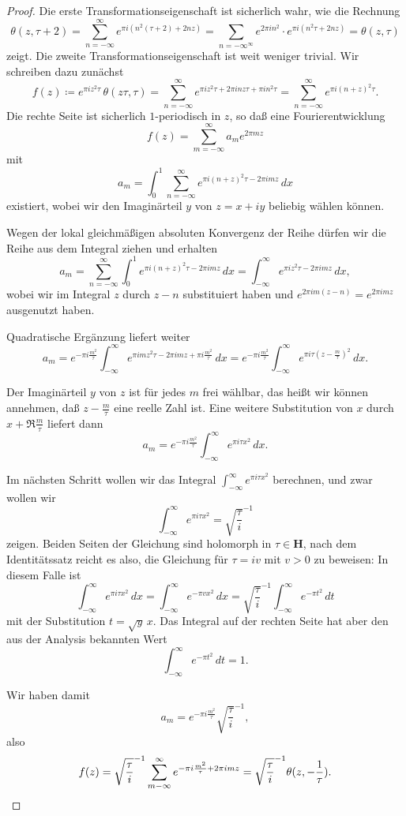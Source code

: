\documentclass[a4paper,twoside,openright]{report}
\theoremstyle{definition}
\theoremstyle{remark}
\begin{document}
\begin{proof}
  Die erste Transformationseigenschaft ist sicherlich wahr, wie die Rechnung
  \[
    \theta(z, \tau + 2) = \sum_{n = -\infty}^\infty e^{\pi i (n^2 (\tau + 2) + 2 n z)}
    = \sum_{n = -\infty^\infty} e^{2 \pi i n^2} \cdot e^{\pi i (n^2 \tau + 2 n z)}
    = \theta(z, \tau)
  \] 
  zeigt. Die zweite Transformationseigenschaft ist weit weniger trivial. Wir
  schreiben dazu zunächst
  \[
    f(z) \coloneqq e^{\pi i z^2 \tau} \, \theta(z \tau, \tau)
    = \sum_{n = -\infty}^\infty e^{\pi i z^2 \tau + 2 \pi i n z \tau + \pi i n^2 \tau}
    = \sum_{n = -\infty}^\infty e^{\pi i (n + z)^2 \tau}.
  \]
  Die rechte Seite ist sicherlich $1$-periodisch in $z$, so daß eine
  Fourierentwicklung
  \[
    f(z) = \sum_{m = -\infty}^\infty a_m e^{2 \pi m z}
  \]
  mit
  \[
    a_m = \int_0^1 \sum_{n = -\infty}^\infty e^{\pi i (n + z)^2 \tau - 2 \pi i m z} \, dx
  \]
  existiert, wobei wir den Imaginärteil $y$ von $z = x + i y$ beliebig wählen können.
  
  Wegen der lokal gleichmäßigen absoluten Konvergenz der Reihe dürfen wir die Reihe aus
  dem Integral ziehen und erhalten
  \[
    a_m = \sum_{n = -\infty}^\infty \int_0^1 e^{\pi i (n + z)^2 \tau - 2 \pi i m z} \, dx
    = \int_{-\infty}^\infty e^{\pi i z^2 \tau - 2 \pi i m z} \, dx,
  \]
  wobei wir im Integral $z$ durch $z - n$ substituiert haben und $e^{2 \pi i m (z - n)}
  = e^{2 \pi i m z}$ ausgenutzt haben.
  
  Quadratische Ergänzung liefert weiter
  \[
    a_m = e^{- \pi i \frac{m^2} \tau} \int_{-\infty}^\infty e^{\pi i m z^2 \tau - 2 \pi i m z + \pi i \frac {m^2} \tau} \, dx
    = e^{- \pi i \frac{m^2} \tau} \int_{-\infty}^\infty e^{\pi i \tau (z - \frac m \tau)^2} \, dx.
  \]
  
  Der Imaginärteil $y$ von $z$ ist für jedes $m$ frei wählbar, das heißt wir
  können annehmen, daß $z - \frac m \tau$ eine reelle Zahl ist. Eine weitere
  Substitution von $x$ durch $x + \Re \frac m \tau$ liefert dann
  \[
    a_m = e^{- \pi i \frac{m^2} \tau} \int_{-\infty}^\infty e^{\pi i \tau x^2} \, dx.
  \]
  
  Im nächsten Schritt wollen wir das Integral $\int_{-\infty}^\infty e^{\pi i \tau x^2}$
  berechnen, und zwar wollen wir
  \[
    \int_{-\infty}^\infty e^{\pi i \tau x^2} = \sqrt{\frac \tau i}^{-1}
  \]
  zeigen. Beiden Seiten der Gleichung sind holomorph in $\tau \in \mathbf H$,
  nach dem Identitätssatz reicht es also, die Gleichung für $\tau = i v$ mit
  $v > 0$ zu beweisen: In diesem Falle ist
  \[
    \int_{-\infty}^\infty e^{\pi i \tau x^2} \, dx = \int_{-\infty}^\infty e^{- \pi v x^2} \, dx
    = \sqrt{\frac \tau i}^{-1} \int_{-\infty}^\infty e^{-\pi t^2} \, dt
  \]
  mit der Substitution $t = \sqrt{y} \, x$. Das Integral auf der rechten Seite hat
  aber den aus der Analysis bekannten Wert
  \[
    \int_{-\infty}^\infty e^{-\pi t^2} \, dt = 1.
  \]
  
  Wir haben damit
  \[
    a_m = e^{-\pi i \frac {m^2} \tau} \sqrt{\frac \tau i}^{-1},
  \]
  also
  \[
    f(z) = \sqrt{\frac \tau i}^{-1} \sum_{m - \infty}^\infty
    e^{- \pi i \frac {m^2} \tau + 2 \pi i m z}
    = \sqrt{\frac \tau i}^{-1} \theta(z, - \frac 1 \tau).
    \qedhere
  \] 
\end{proof}
\end{document}
